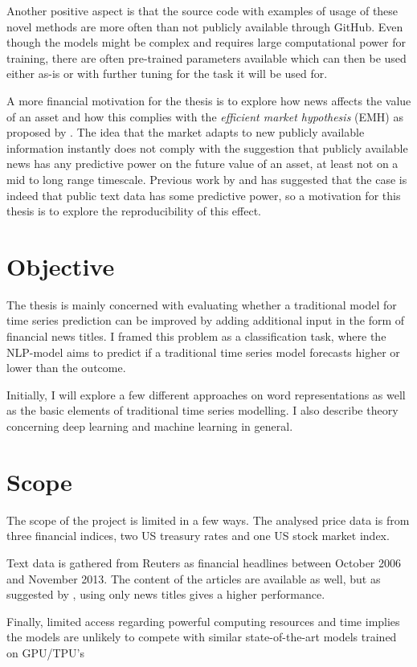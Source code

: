 Another positive aspect is that the source code with examples of usage of these novel methods are more often than not publicly available through GitHub. Even though the models might be complex and requires large computational power for training, there are often pre-trained parameters available which can then be used either as-is or with further tuning for the task it will be used for. 

A more financial motivation for the thesis is to explore how news affects the value of an asset and how this complies with the \emph{efficient market hypothesis} (EMH) as proposed by \citet{malkiel1970efficient}. The idea that the market adapts to new publicly available information instantly does not comply with the suggestion that publicly available news has any predictive power on the future value of an asset, at least not on a mid to long range timescale. Previous work by  \citet{xing} and \citet{arorausing} has suggested that the case is indeed that public text data has some predictive power, so a motivation for this thesis is to explore the reproducibility of this effect.

\section{Objective}

The thesis is mainly concerned with evaluating whether a traditional model for time series prediction can be improved by adding additional input in the form of financial news titles.
I framed this problem as a classification task, where the NLP-model aims to predict if a traditional time series model forecasts higher or lower than the outcome. 

Initially, I will explore a few different approaches on word representations as well as the basic elements of traditional time series modelling. I also describe theory concerning deep learning and machine learning in general. 



\section{Scope}

The scope of the project is limited in a few ways. The analysed price data is from three financial indices, two US treasury rates and one US stock market index. 

Text data is gathered from Reuters as financial headlines between October 2006 and November 2013. The content of the articles are available as well, but as suggested by \citet{ding2014using}, using only news titles gives a higher performance. 

Finally, limited access regarding powerful computing resources and time implies the models are unlikely to compete with similar state-of-the-art models trained on GPU/TPU's 


